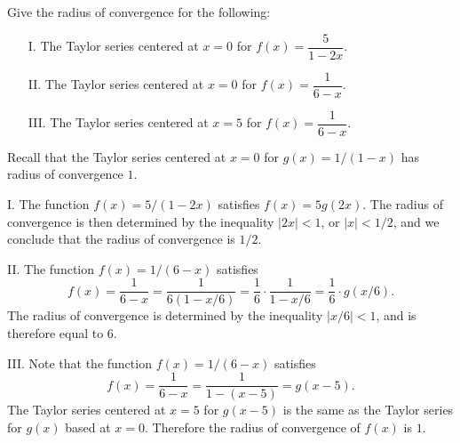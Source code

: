 \documentclass[noauthor]{ximera}
\begin{document}
\begin{problem} Give the radius of convergence for the following:
\begin{itemize}
\item[I.] The Taylor series centered at $x=0$ for $f(x) = \dfrac{5}{1-2x}$.
\item[II.] The Taylor series centered at $x=0$ for $f(x) = \dfrac{1}{6-x}$.
\item[III.] The Taylor series centered at $x=5$ for $f(x) = \dfrac{1}{6-x}$.
\end{itemize}

\begin{freeResponse}
Recall that the Taylor series centered at $x=0$ for $g(x) = 1/(1-x)$ has radius of convergence $1$. 

I. The function $f(x) = 5/(1-2x)$ satisfies $f(x) = 5 g(2x)$. The radius of convergence is then determined by the inequality $|2x| < 1$, or $|x| < 1/2$, and we conclude that the radius of convergence is $1/2$. 

II. The function $f(x) = 1/(6-x)$ satisfies
$$
f(x) = \frac{1}{6-x} = \frac{1}{6(1-x/6)} = \frac{1}{6} \cdot \frac{1}{1-x/6} = \frac{1}{6} \cdot g(x/6). 
$$
The radius of convergence is determined by the inequality $|x/6| < 1$, and is therefore equal to $6$.

III. Note that the function $f(x) = 1/(6-x)$ satisfies 
$$
f(x) = \frac{1}{6-x} = \frac{1}{1-(x-5)} = g(x-5).
$$
The Taylor series centered at $x=5$ for $g(x-5)$ is the same as the Taylor series for $g(x)$ based at $x=0$. Therefore the radius of convergence of $f(x)$ is $1$.
\end{freeResponse}
\end{problem}
\end{document}
